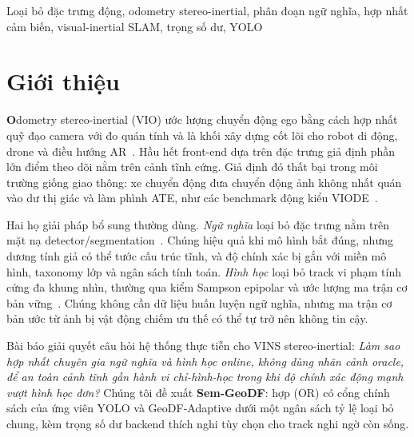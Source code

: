 \documentclass{ieeeaccess}
\renewcommand{\IEEEPARstart}[2]{{\sffamily\bfseries\fontsize{24}{26}\selectfont #1}#2}
\begin{document}
\begin{keywords}
Loại bỏ đặc trưng động, odometry stereo-inertial, phân đoạn ngữ nghĩa, hợp nhất cảm biến, visual-inertial SLAM, trọng số dư, YOLO
\end{keywords}

\titlepgskip=-15pt

\maketitle

\section{Giới thiệu}

\IEEEPARstart{O}{dometry} stereo-inertial (VIO) ước lượng chuyển động ego bằng cách hợp nhất quỹ đạo camera với đo quán tính và là khối xây dựng cốt lõi cho robot di động, drone và điều hướng AR~\cite{qin2018vins,qin2019vinsfusion}.
Hầu hết front-end dựa trên đặc trưng giả định phần lớn điểm theo dõi nằm trên cảnh tĩnh cứng.
Giả định đó thất bại trong môi trường giống giao thông: xe chuyển động đưa chuyển động ảnh không nhất quán vào dư thị giác và làm phình ATE, như các benchmark động kiểu VIODE~\cite{minoda2021viode}.

Hai họ giải pháp bổ sung thường dùng.
\emph{Ngữ nghĩa} loại bỏ đặc trưng nằm trên mặt nạ detector/segmentation~\cite{bescos2018dynaslam,yu2018dsslam,song2022dynavins}.
Chúng hiệu quả khi mô hình bắt đúng, nhưng dương tính giả có thể tước cấu trúc tĩnh, và độ chính xác bị gắn với miền mô hình, taxonomy lớp và ngân sách tính toán.
\emph{Hình học} loại bỏ track vi phạm tính cứng đa khung nhìn, thường qua kiểm Sampson epipolar và ước lượng ma trận cơ bản vững~\cite{hartley2003multiple}.
Chúng không cần dữ liệu huấn luyện ngữ nghĩa, nhưng ma trận cơ bản ước từ ảnh bị vật động chiếm ưu thế có thể tự trở nên không tin cậy.

Bài báo giải quyết câu hỏi hệ thống thực tiễn cho VINS stereo-inertial:
\emph{Làm sao hợp nhất chuyên gia ngữ nghĩa và hình học online, không dùng nhãn cảnh oracle, để an toàn cảnh tĩnh gần hành vi chỉ-hình-học trong khi độ chính xác động mạnh vượt hình học đơn?}
Chúng tôi đề xuất \textbf{Sem-GeoDF}: hợp (OR) có cổng chính sách của ứng viên YOLO và GeoDF-Adaptive dưới một ngân sách tỷ lệ loại bỏ chung, kèm trọng số dư backend thích nghi tùy chọn cho track nghi ngờ còn sống.
\end{document}
